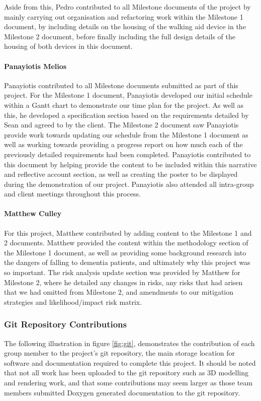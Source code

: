                 Aside from this, Pedro contributed to all Milestone documents of the project by mainly carrying out organisation and refactoring work within the Milestone 1 document, by including details on the housing of the walking aid device in the Milestone 2 document, before finally including the full design details of the housing of both devices in this document.

                \paragraph{Panayiotis Melios}\mbox{}

                Panayiotis contributed to all Milestone documents submitted as part of this project. For the Milestone 1 document, Panayiotis developed our initial schedule within a Gantt chart to demonstrate our time plan for the project. As well as this, he developed a specification section based on the requirements detailed by Sean and agreed to by the client. The Milestone 2 document saw Panayiotis provide work towards updating our schedule from the Milestone 1 document as well as working towards providing a progress report on how much each of the previously detailed requirements had been completed. Panayiotis contributed to this document by helping provide the content to be included within this narrative and reflective account section, as well as creating the poster to be displayed during the demonstration of our project. Panayiotis also attended all intra-group and client meetings throughout this process. 

                \paragraph{Matthew Culley}\mbox{}

                For this project, Matthew contributed by adding content to the Milestone 1 and 2 documents. Matthew provided the content within the methodology section of the Milestone 1 document, as well as providing some background research into the dangers of falling to dementia patients, and ultimately why this project was so important. The risk analysis update section was provided by Matthew for Milestone 2, where he detailed any changes in risks, any risks that had arisen that we had omitted from Milestone 2, and amendments to our mitigation strategies and likelihood/impact risk matrix.

            \subsubsection{Git Repository Contributions}

                The following illustration in figure \ref{fig:git}, demonstrates the contribution of each group member to the project's git repository, the main storage location for software and documentation required to complete this project. It should be noted that not all work has been uploaded to the git repository such as 3D modelling and rendering work, and that some contributions may seem larger as those team members submitted Doxygen generated documentation to the git repository.

                